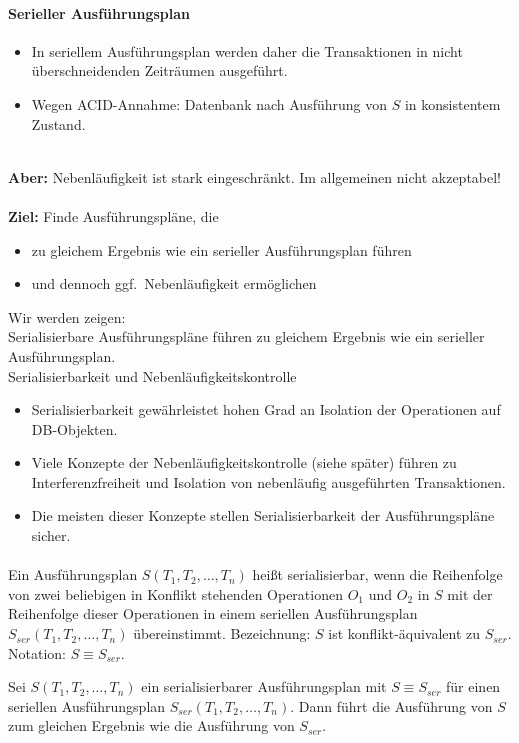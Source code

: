\begin{frame}{\insertsection}
\framesubtitle{Serieller Ausführungsplan}
\begin{itemize}
\item In seriellem Ausf\"uhrungsplan werden daher die Transaktionen in nicht \"uberschneidenden Zeitr\"aumen ausgef\"uhrt.
\item Wegen ACID-Annahme: Datenbank nach Ausf\"uhrung von $S$ in konsistentem Zustand.	
\end{itemize}
\ \\[4pt]
\pause
\textbf{Aber:} Nebenl\"aufigkeit ist stark eingeschr\"ankt. Im allgemeinen nicht akzeptabel!
\end{frame}

\begin{frame}{\insertsection}
\framesubtitle{\insertsubsection}
\textbf{Ziel:}	Finde Ausf\"uhrungspl\"ane, die 
\begin{itemize}
	\item zu gleichem Ergebnis wie ein serieller Ausf\"uhrungsplan f\"uhren
	\item und dennoch ggf.~Nebenl\"aufigkeit erm\"oglichen
\end{itemize}
\pause
\abs
Wir werden zeigen: 
\\[4pt]
Serialisierbare Ausf\"uhrungspl\"ane f\"uhren zu gleichem Ergebnis wie ein serieller Ausf\"uhrungsplan.
\pause
\\[10pt]
Serialisierbarkeit und Nebenl\"aufigkeitskontrolle
\begin{itemize}
	\item Serialisierbarkeit gew\"ahrleistet hohen Grad an Isolation der Operationen auf DB-Objekten.
	\item Viele Konzepte der Nebenl\"aufigkeitskontrolle (siehe sp\"ater) f\"uhren zu Interferenzfreiheit und Isolation
	von nebenl\"aufig ausgef\"uhrten Transaktionen. 
	\item Die meisten dieser Konzepte stellen Serialisierbarkeit der Ausf\"uhrungspl\"ane sicher.
\end{itemize}
\end{frame}

\begin{frame}{\insertsection}
\framesubtitle{\insertsubsection}
\begin{definition}
Ein Ausführungsplan $S(T_1,T_2,\dots ,T_n)$ hei\ss t serialisierbar, wenn die Reihenfolge von 
zwei beliebigen in Konflikt stehenden Operationen $O_1$ und $O_2$ in $S$ mit der Reihenfolge  
dieser Operationen in einem seriellen Ausführungsplan $S_{ser}(T_1,T_2,\dots ,T_n)$ \"ubereinstimmt.
\abs
Bezeichnung: $S$ ist konflikt-\"aquivalent zu $S_{ser}$.
\nl
Notation: $S\equiv S_{ser}$.
\end{definition}
\pause
\abs
\begin{theorem}
Sei $S(T_1,T_2,\dots ,T_n)$ ein serialisierbarer Ausführungsplan mit $S\equiv S_{ser}$ f\"ur einen 
seriellen Ausführungsplan $S_{ser}(T_1,T_2,\dots ,T_n)$.
\abs
Dann f\"uhrt die Ausf\"uhrung von $S$ zum gleichen Ergebnis wie die Ausf\"uhrung von $S_{ser}$.
\end{theorem}
\end{frame}

